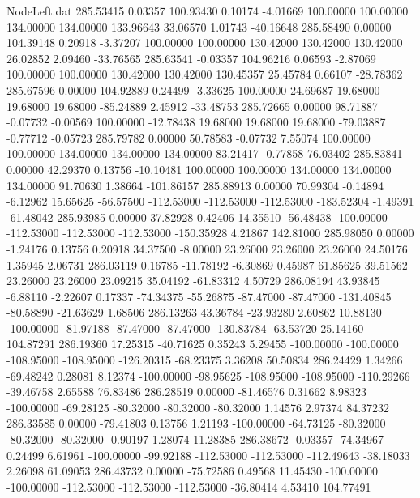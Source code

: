 \begin{filecontents}{NodeLeft.dat}
 285.53415    0.03357  100.93430     0.10174   -4.01669  100.00000  100.00000  134.00000  134.00000  133.96643   33.06570    1.01743  -40.16648
 285.58490    0.00000  104.39148     0.20918   -3.37207  100.00000  100.00000  130.42000  130.42000  130.42000   26.02852    2.09460  -33.76565
 285.63541   -0.03357  104.96216     0.06593   -2.87069  100.00000  100.00000  130.42000  130.42000  130.45357   25.45784    0.66107  -28.78362
 285.67596    0.00000  104.92889     0.24499   -3.33625  100.00000   24.69687   19.68000   19.68000   19.68000  -85.24889    2.45912  -33.48753
 285.72665    0.00000   98.71887    -0.07732   -0.00569  100.00000  -12.78438   19.68000   19.68000   19.68000  -79.03887   -0.77712   -0.05723
 285.79782    0.00000   50.78583    -0.07732    7.55074  100.00000  100.00000  134.00000  134.00000  134.00000   83.21417   -0.77858   76.03402
 285.83841    0.00000   42.29370     0.13756  -10.10481  100.00000  100.00000  134.00000  134.00000  134.00000   91.70630    1.38664 -101.86157
 285.88913    0.00000   70.99304    -0.14894   -6.12962   15.65625  -56.57500 -112.53000 -112.53000 -112.53000 -183.52304   -1.49391  -61.48042
 285.93985    0.00000   37.82928     0.42406   14.35510  -56.48438 -100.00000 -112.53000 -112.53000 -112.53000 -150.35928    4.21867  142.81000
 285.98050    0.00000   -1.24176     0.13756    0.20918   34.37500   -8.00000   23.26000   23.26000   23.26000   24.50176    1.35945    2.06731
 286.03119    0.16785  -11.78192    -6.30869    0.45987   61.85625   39.51562   23.26000   23.26000   23.09215   35.04192  -61.83312    4.50729
 286.08194   43.93845   -6.88110    -2.22607    0.17337  -74.34375  -55.26875  -87.47000  -87.47000 -131.40845  -80.58890  -21.63629    1.68506
 286.13263   43.36784  -23.93280     2.60862   10.88130 -100.00000  -81.97188  -87.47000  -87.47000 -130.83784  -63.53720   25.14160  104.87291
 286.19360   17.25315  -40.71625     0.35243    5.29455 -100.00000 -100.00000 -108.95000 -108.95000 -126.20315  -68.23375    3.36208   50.50834
 286.24429    1.34266  -69.48242     0.28081    8.12374 -100.00000  -98.95625 -108.95000 -108.95000 -110.29266  -39.46758    2.65588   76.83486
 286.28519    0.00000  -81.46576     0.31662    8.98323 -100.00000  -69.28125  -80.32000  -80.32000  -80.32000    1.14576    2.97374   84.37232
 286.33585    0.00000  -79.41803     0.13756    1.21193 -100.00000  -64.73125  -80.32000  -80.32000  -80.32000   -0.90197    1.28074   11.28385
 286.38672   -0.03357  -74.34967     0.24499    6.61961 -100.00000  -99.92188 -112.53000 -112.53000 -112.49643  -38.18033    2.26098   61.09053
 286.43732    0.00000  -75.72586     0.49568   11.45430 -100.00000 -100.00000 -112.53000 -112.53000 -112.53000  -36.80414    4.53410  104.77491

\end{filecontents}
